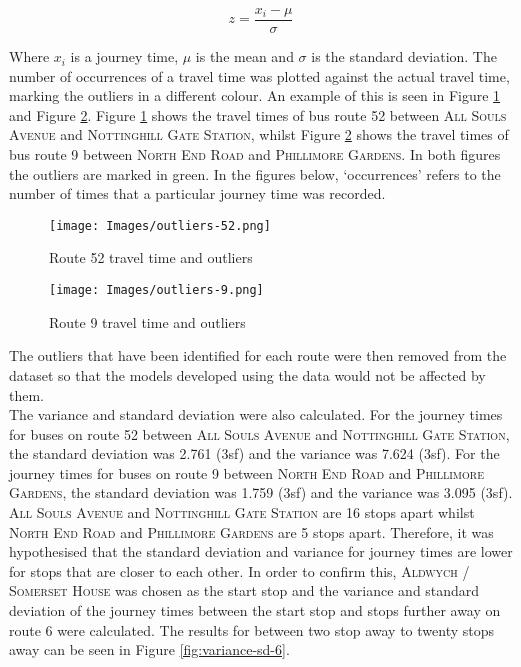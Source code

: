 \begin{equation}
    z = \frac{x_i - \mu}{\sigma}
    \label{eqn:z-score}
\end{equation}

\noindent Where $x_i$ is a journey time, $\mu$ is the mean and $\sigma$ is the standard deviation. The number of occurrences of a travel time was plotted against the actual travel time, marking the outliers in a different colour. An example of this is seen in Figure \ref{fig:outlier-occurences-52} and Figure \ref{fig:outlier-occurences-9}. Figure \ref{fig:outlier-occurences-52} shows the travel times of bus route 52 between \textsc{All Souls Avenue} and \textsc{Nottinghill Gate Station}, whilst Figure \ref{fig:outlier-occurences-9} shows the travel times of bus route 9 between \textsc{North End Road} and \textsc{Phillimore Gardens}. In both figures the outliers are marked in green. In the figures below, `occurrences' refers to the number of times that a particular journey time was recorded.

\begin{figure}[H]
\begin{center}
    \texttt{[image: Images/outliers-52.png]}
    \caption{Route 52 travel time and outliers}
    \label{fig:outlier-occurences-52}
\end{center}
\end{figure}

\begin{figure}[H]
\begin{center}
    \texttt{[image: Images/outliers-9.png]}
    \caption{Route 9 travel time and outliers}
    \label{fig:outlier-occurences-9}
\end{center}
\end{figure}

The outliers that have been identified for each route were then removed from the dataset so that the models developed using the data would not be affected by them. \\

The variance and standard deviation were also calculated. For the journey times for buses on route 52 between \textsc{All Souls Avenue} and \textsc{Nottinghill Gate Station}, the standard deviation was 2.761 (3sf) and the variance was 7.624 (3sf). For the journey times for buses on route 9 between \textsc{North End Road} and \textsc{Phillimore Gardens}, the standard deviation was 1.759 (3sf) and the variance was 3.095 (3sf). \textsc{All Souls Avenue} and \textsc{Nottinghill Gate Station} are 16 stops apart whilst \textsc{North End Road} and \textsc{Phillimore Gardens} are 5 stops apart. Therefore, it was hypothesised that the standard deviation and variance for journey times are lower for stops that are closer to each other. In order to confirm this, \textsc{Aldwych / Somerset House} was chosen as the start stop and the variance and standard deviation of the journey times between the start stop and stops further away on route 6 were calculated. The results for between two stop away to twenty stops away can be seen in Figure \ref{fig:variance-sd-6}.

